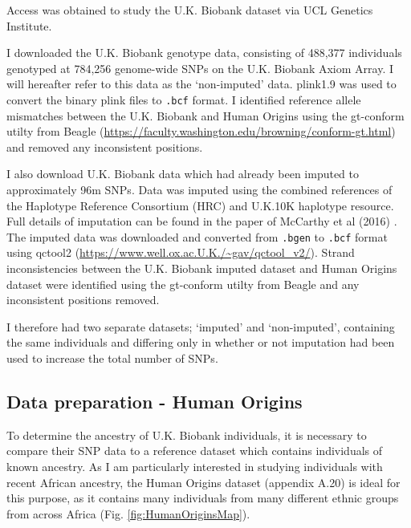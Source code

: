 Access was obtained to study the U.K. Biobank dataset via UCL Genetics Institute. 

I downloaded the U.K. Biobank genotype data, consisting of 488,377 individuals genotyped at 784,256 genome-wide SNPs on the U.K. Biobank Axiom Array. I will hereafter refer to this data as the `non-imputed' data. plink1.9 \cite{purcell2007plink} was used to convert the binary plink files to \texttt{.bcf} format. I identified reference allele mismatches between the U.K. Biobank and Human Origins using the gt-conform utilty from Beagle (\url{https://faculty.washington.edu/browning/conform-gt.html}) and removed any inconsistent positions. 

I also download U.K. Biobank data which had already been imputed to approximately 96m SNPs. Data was imputed using the combined references of the Haplotype Reference Consortium (HRC) and U.K.10K haplotype resource. Full details of imputation can be found in the paper of McCarthy et al (2016) \cite{mccarthy2016reference}. The imputed data was downloaded and converted from \texttt{.bgen} to \texttt{.bcf} format using qctool2 (\url{https://www.well.ox.ac.U.K./~gav/qctool_v2/}). Strand inconsistencies between the U.K. Biobank imputed dataset and Human Origins dataset were identified using the gt-conform utilty from Beagle and any inconsistent positions removed.

I therefore had two separate datasets; `imputed' and `non-imputed', containing the same individuals and differing only in whether or not imputation had been used to increase the total number of SNPs.

\subsection{Data preparation - Human Origins}

To determine the ancestry of U.K. Biobank individuals, it is necessary to compare their SNP data to a reference dataset which contains individuals of known ancestry. As I am particularly interested in studying individuals with recent African ancestry, the Human Origins dataset (appendix A.20) is ideal for this purpose, as it contains many individuals from many different ethnic groups from across Africa (Fig. \ref{fig:HumanOriginsMap}).


